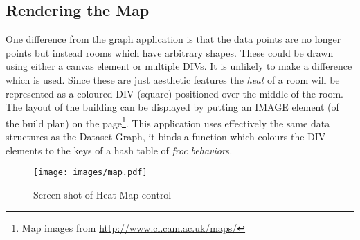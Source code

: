 \subsection{Rendering the Map}
One difference from the graph application is that the data points are no longer points but instead rooms which have arbitrary shapes. These could be drawn using either a canvas element or multiple DIVs. It is unlikely to make a difference which is used. Since these are just aesthetic features the \emph{heat} of a room will be represented as a coloured DIV (square) positioned over the middle of the room. The layout of the building can be displayed by putting an IMAGE element (of the build plan) on the page\footnote{Map images from \url{http://www.cl.cam.ac.uk/maps/}}. This application uses effectively the same data structures as the Dataset Graph, it binds a function which colours the DIV elements to the keys of a hash table of \emph{froc} \emph{behavior}s.

\begin{figure}
  \centering
  \texttt{[image: images/map.pdf]}
  \caption{Screen-shot of Heat Map control}
  \label{fig:map}
\end{figure}
